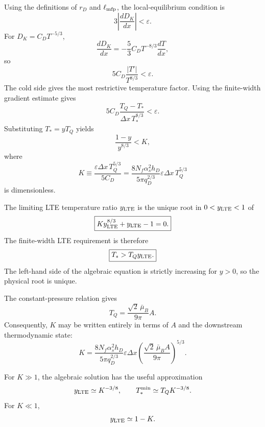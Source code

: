 Using the definitions of \(r_D\) and \(\ell_{\rm mfp}\), the local-equilibrium
condition is
\begin{equation}
3\left|\frac{dD_K}{dx}\right|<\varepsilon.
\end{equation}
For \(D_K=C_DT^{-5/3}\),
\begin{equation}
\frac{dD_K}{dx}
=
-\frac{5}{3}C_DT^{-8/3}\frac{dT}{dx},
\end{equation}
so
\begin{equation}
5C_D\frac{|T'|}{T^{8/3}}<\varepsilon.
\end{equation}
The cold side gives the most restrictive temperature factor.  Using the
finite-width gradient estimate gives
\begin{equation}
5C_D
\frac{T_Q-T_*}
{\Delta x\,T_*^{8/3}}
<\varepsilon.
\end{equation}
Substituting \(T_*=yT_Q\) yields
\begin{equation}
\frac{1-y}{y^{8/3}}<K,
\end{equation}
where
\begin{equation}
\boxed{
K
\equiv
\frac{\varepsilon\Delta x\,T_Q^{5/3}}{5C_D}
=
\frac{8N_f\alpha_s^2h_D}
{5\pi q_D^{2/3}}
\varepsilon\Delta x\,T_Q^{5/3}
}
\end{equation}
is dimensionless.

The limiting LTE temperature ratio \(y_{\rm LTE}\) is the unique root in
\(0<y_{\rm LTE}<1\) of
\begin{equation}
\boxed{
K y_{\rm LTE}^{8/3}+y_{\rm LTE}-1=0.
}
\end{equation}
The finite-width LTE requirement is therefore
\begin{equation}
\boxed{
T_*>T_Qy_{\rm LTE}.
}
\end{equation}
The left-hand side of the algebraic equation is strictly increasing for
\(y>0\), so the physical root is unique.

The constant-pressure relation gives
\begin{equation}
T_Q
=
\frac{\sqrt{2}\,\bar\mu_B}{9\pi}A.
\end{equation}
Consequently, \(K\) may be written entirely in terms of \(A\) and the
downstream thermodynamic state:
\begin{equation}
\boxed{
K
=
\frac{8N_f\alpha_s^2h_D}
{5\pi q_D^{2/3}}
\varepsilon\Delta x
\left(
\frac{\sqrt{2}\,\bar\mu_B A}{9\pi}
\right)^{5/3}.
}
\end{equation}

For \(K\gg1\), the algebraic solution has the useful approximation
\begin{equation}
y_{\rm LTE}\simeq K^{-3/8},
\qquad
T_*^{\rm min}\simeq T_QK^{-3/8}.
\end{equation}
For \(K\ll1\),
\begin{equation}
y_{\rm LTE}\simeq1-K.
\end{equation}

